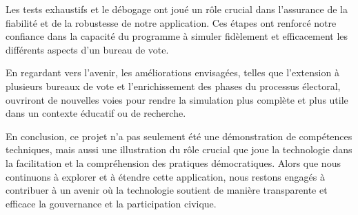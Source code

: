 \documentclass[12pt]{article} %
\begin{document}
	Les tests exhaustifs et le débogage ont joué un rôle crucial dans l'assurance de la fiabilité et de la robustesse de notre application. Ces étapes ont renforcé notre confiance dans la capacité du programme à simuler fidèlement et efficacement les différents aspects d'un bureau de vote.
	
	En regardant vers l'avenir, les améliorations envisagées, telles que l'extension à plusieurs bureaux de vote et l'enrichissement des phases du processus électoral, ouvriront de nouvelles voies pour rendre la simulation plus complète et plus utile dans un contexte éducatif ou de recherche.
	
	En conclusion, ce projet n'a pas seulement été une démonstration de compétences techniques, mais aussi une illustration du rôle crucial que joue la technologie dans la facilitation et la compréhension des pratiques démocratiques. Alors que nous continuons à explorer et à étendre cette application, nous restons engagés à contribuer à un avenir où la technologie soutient de manière transparente et efficace la gouvernance et la participation civique.
	
	
\end{document}
